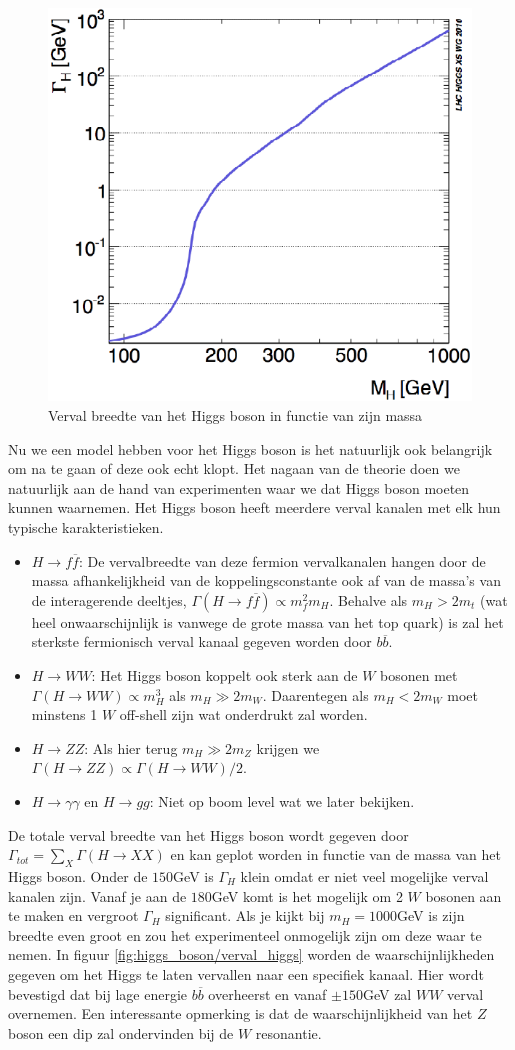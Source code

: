 \documentclass[../main.tex]{subfiles}
\begin{document}
\begin{figure}[h]
    \centering
    \includegraphics[width=0.5\linewidth]{higgs_boson/verval_breedte_higgs.png}
    \caption{Verval breedte van het Higgs boson in functie van zijn massa}%
    \label{fig:higgs_boson/verval_breedte_higgs}
\end{figure}

Nu we een model hebben voor het Higgs boson is het natuurlijk ook belangrijk om na te gaan of deze ook echt klopt. Het nagaan van de theorie doen we natuurlijk aan de hand van experimenten waar we dat Higgs boson moeten kunnen waarnemen. Het Higgs boson heeft meerdere verval kanalen met elk hun typische karakteristieken.
\begin{itemize}
    \item $H\rightarrow f\overline f$: De vervalbreedte van deze fermion vervalkanalen hangen door de massa afhankelijkheid van de koppelingsconstante ook af van de massa's van de interagerende deeltjes, $\Gamma(H\rightarrow f\overline f) \propto m_f^2m_H$. Behalve als $m_H > 2m_t$ (wat heel onwaarschijnlijk is vanwege de grote massa van het top quark) is zal het sterkste fermionisch verval kanaal gegeven worden door $b\overline b$.
    \item $H\rightarrow WW$: Het Higgs boson koppelt ook sterk aan de $W$ bosonen met $\Gamma(H\rightarrow WW)\propto m_H^3$ als $m_H \gg 2m_W$. Daarentegen als $m_H < 2m_W$ moet minstens 1 $W$ off-shell zijn wat onderdrukt zal worden.
    \item $H\rightarrow ZZ$: Als hier terug $m_H \gg 2m_Z$ krijgen we $\Gamma(H\rightarrow ZZ)\propto \Gamma(H\rightarrow WW)/2$.
    \item $H\rightarrow \gamma\gamma$ en $H \rightarrow gg$: Niet op boom level wat we later bekijken.
\end{itemize}
De totale verval breedte van het Higgs boson wordt gegeven door $\Gamma_{tot} = \sum_X \Gamma(H\rightarrow XX)$ en kan geplot worden in functie van de massa van het Higgs boson. Onder de $150$GeV is $\Gamma_H$ klein omdat er niet veel mogelijke verval kanalen zijn. Vanaf je aan de $180$GeV komt is het mogelijk om 2 $W$ bosonen aan te maken en vergroot $\Gamma_H$  significant. Als je kijkt bij $m_H=1000$GeV is zijn breedte even groot en zou het experimenteel onmogelijk zijn om deze waar te nemen. In figuur \ref{fig:higgs_boson/verval_higgs} worden de waarschijnlijkheden gegeven om het Higgs te laten vervallen naar een specifiek kanaal. Hier wordt bevestigd dat bij lage energie $b\overline b$ overheerst en vanaf $\pm 150$GeV zal $WW$ verval overnemen. Een interessante opmerking is dat de waarschijnlijkheid van het $Z$ boson een dip zal ondervinden bij de $W$ resonantie.
\end{document}
